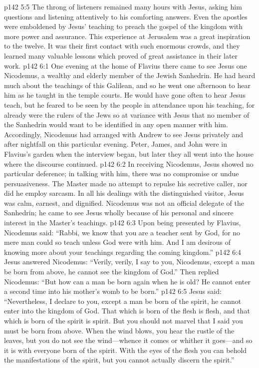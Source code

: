 \pc \vs p142 5:5 The throng of listeners remained many hours with Jesus, asking him questions and listening attentively to his comforting answers. Even the apostles were emboldened by Jesus’ teaching to preach the gospel of the kingdom with more power and assurance. This experience at Jerusalem was a great inspiration to the twelve. It was their first contact with such enormous crowds, and they learned many valuable lessons which proved of great assistance in their later work.\plusone
{}
\vs p142 6:1 One evening at the home of Flavius there came to see Jesus one Nicodemus, a wealthy and elderly member of the Jewish Sanhedrin. He had heard much about the teachings of this Galilean, and so he went one afternoon to hear him as he taught in the temple courts. He would have gone often to hear Jesus teach, but he feared to be seen by the people in attendance upon his teaching, for already were the rulers of the Jews so at variance with Jesus that no member of the Sanhedrin would want to be identified in any open manner with him. Accordingly, Nicodemus had arranged with Andrew to see Jesus privately and after nightfall on this particular evening. Peter, James, and John were in Flavius’s garden when the interview began, but later they all went into the house where the discourse continued.
\vs p142 6:2 In receiving Nicodemus, Jesus showed no particular deference; in talking with him, there was no compromise or undue persuasiveness. The Master made no attempt to repulse his secretive caller, nor did he employ sarcasm. In all his dealings with the distinguished visitor, Jesus was calm, earnest, and dignified. Nicodemus was not an official delegate of the Sanhedrin; he came to see Jesus wholly because of his personal and sincere interest in the Master’s teachings.
\vs p142 6:3 Upon being presented by Flavius, Nicodemus said: “Rabbi, we know that you are a teacher sent by God, for no mere man could so teach unless God were with him. And I am desirous of knowing more about your teachings regarding the coming kingdom.”
\vs p142 6:4 Jesus answered Nicodemus: \textcolor{ubdarkred}{“Verily, verily, I say to you, Nicodemus, except a man be born from above, he cannot see the kingdom of God.”} Then replied Nicodemus: “But how can a man be born again when he is old? He cannot enter a second time into his mother’s womb to be born.”
\vs p142 6:5 Jesus said: \textcolor{ubdarkred}{“Nevertheless, I declare to you, except a man be born of the spirit, he cannot enter into the kingdom of God. That which is born of the flesh is flesh, and that which is born of the spirit is spirit. But you should not marvel that I said you must be born from above. When the wind blows, you hear the rustle of the leaves, but you do not see the wind---whence it comes or whither it goes---and so it is with everyone born of the spirit. With the eyes of the flesh you can behold the manifestations of the spirit, but you cannot actually discern the spirit.”}
